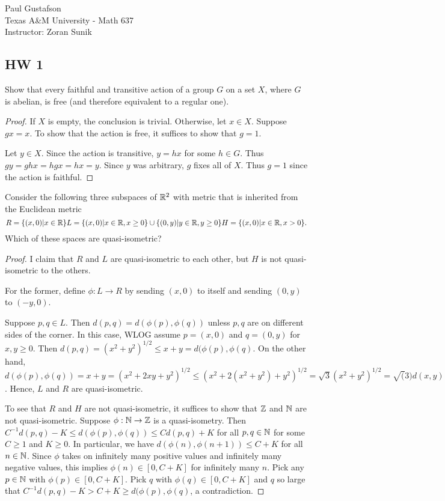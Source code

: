 \documentclass{article}
\begin{document}
\noindent Paul Gustafson\\
\noindent Texas A\&M University - Math 637\\ 
\noindent Instructor: Zoran Sunik

\subsection*{HW 1}
  Show that every faithful and transitive action of a group $G$ on a set $X$, where $G$ is abelian, is free (and therefore equivalent to a regular one).
\begin{proof} 
If $X$ is empty, the conclusion is trivial.  Otherwise, let $x \in X$.  Suppose $gx = x$.  To show that the action is free, it suffices to show that $g = 1$.

Let $y \in X$.  Since the action is transitive, $y = hx$ for some $h \in G$.  Thus $gy = ghx = hgx = hx = y$.  Since $y$ was arbitrary, $g$ fixes all of $X$.  Thus $g = 1$ since the action is faithful.
\end{proof}

 Consider the following three subspaces of $\mathbb{R}^2$ with metric that is inherited from the Euclidean metric
$$
R = \{ (x,0) | x \in \mathbb{R} \}
\\
L = \{ (x,0) | x \in \mathbb{R}, x \ge 0\} \cup \{(0,y) | y \in \mathbb{R}, y \ge 0 \}
\\
H = \{ (x, 0) | x \in \mathbb{R}, x > 0 \}.
$$
Which of these spaces are quasi-isometric?
\begin{proof}
I claim that $R$ and $L$ are quasi-isometric to each other, but $H$ is not quasi-isometric to the others.

For the former, define $\phi: L \to R$ by sending $(x,0)$ to itself and sending $(0,y)$ to $(-y,0)$.

Suppose $p,q \in L$.  Then $d(p,q) = d(\phi(p), \phi(q))$ unless $p,q$ are on different sides of the corner.
In this case, WLOG assume $p = (x,0)$ and $q = (0,y)$ for $x,y \ge 0$.  Then $d(p,q) = (x^2 + y^2)^{1/2} \le x + y = d(\phi(p), \phi(q)$.
On the other hand, $d(\phi(p), \phi(q)) = x + y = (x^2 + 2xy + y^2)^{1/2} \le (x^2 + 2(x^2 + y^2) + y^2)^{1/2} =  \sqrt{3} (x^2 + y^2)^{1/2} = \sqrt(3) d(x,y)$.
Hence, $L$ and $R$ are quasi-isometric.

To see that $R$ and $H$ are not quasi-isometric, it suffices to show that $\mathbb{Z}$ and $\mathbb{N}$ are not quasi-isometric. Suppose $\phi: \mathbb{N} \to \mathbb{Z}$ is a quasi-isometry. Then $C^{-1} d(p,q) - K \le d(\phi(p), \phi(q)) \le C d(p,q) + K$ for all $p,q \in \mathbb{N}$ for some $C \ge 1$ and $K \ge 0$.  In particular, we have $d(\phi(n), \phi(n+1)) \le C + K$ for all $n \in \mathbb{N}$. Since $\phi$ takes on infinitely many positive values and infinitely many negative values, this implies $\phi(n) \in [0, C+K]$ for infinitely many $n$. Pick any $p \in \mathbb{N}$ with $\phi(p) \in [0, C+K]$.  Pick $q$ with $\phi(q) \in [0, C+K]$ and $q$ so large that $C^{-1} d(p,q) - K > C+K  \ge d(\phi(p), \phi(q)$, a contradiction.
\end{proof}
\end{document}
